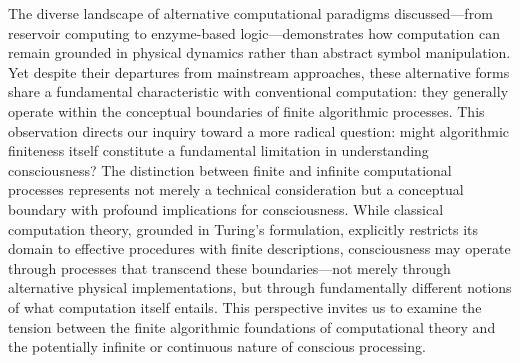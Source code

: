 The diverse landscape of alternative computational paradigms discussed—from reservoir computing to enzyme-based logic—demonstrates how computation can remain grounded in physical dynamics rather than abstract symbol manipulation. Yet despite their departures from mainstream approaches, these alternative forms share a fundamental characteristic with conventional computation: they generally operate within the conceptual boundaries of finite algorithmic processes. This observation directs our inquiry toward a more radical question: might algorithmic finiteness itself constitute a fundamental limitation in understanding consciousness? The distinction between finite and infinite computational processes represents not merely a technical consideration but a conceptual boundary with profound implications for consciousness. While classical computation theory, grounded in Turing's formulation, explicitly restricts its domain to effective procedures with finite descriptions, consciousness may operate through processes that transcend these boundaries—not merely through alternative physical implementations, but through fundamentally different notions of what computation itself entails. This perspective invites us to examine the tension between the finite algorithmic foundations of computational theory and the potentially infinite or continuous nature of conscious processing.
